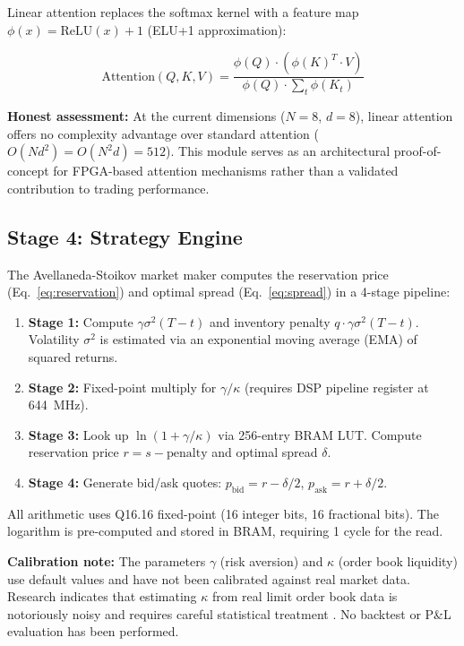 \documentclass[conference,10pt]{IEEEtran}
\begin{document}
Linear attention replaces the softmax kernel with a feature map $\phi(x) = \text{ReLU}(x) + 1$ (ELU+1 approximation):

\begin{equation}
\text{Attention}(Q,K,V) = \frac{\phi(Q) \cdot \left(\phi(K)^T \cdot V\right)}{\phi(Q) \cdot \sum_t \phi(K_t)}
\end{equation}

\textbf{Honest assessment:} At the current dimensions ($N = 8$, $d = 8$), linear attention offers no complexity advantage over standard attention ($O(N d^2) = O(N^2 d) = 512$). This module serves as an architectural proof-of-concept for FPGA-based attention mechanisms rather than a validated contribution to trading performance.

\subsection{Stage 4: Strategy Engine}

The Avellaneda-Stoikov market maker computes the reservation price (Eq.~\ref{eq:reservation}) and optimal spread (Eq.~\ref{eq:spread}) in a 4-stage pipeline:

\begin{enumerate}[leftmargin=*]
    \item \textbf{Stage 1:} Compute $\gamma \sigma^2 (T-t)$ and inventory penalty $q \cdot \gamma \sigma^2 (T-t)$. Volatility $\sigma^2$ is estimated via an exponential moving average (EMA) of squared returns.
    \item \textbf{Stage 2:} Fixed-point multiply for $\gamma/\kappa$ (requires DSP pipeline register at 644~MHz).
    \item \textbf{Stage 3:} Look up $\ln(1 + \gamma/\kappa)$ via 256-entry BRAM LUT. Compute reservation price $r = s - \text{penalty}$ and optimal spread $\delta$.
    \item \textbf{Stage 4:} Generate bid/ask quotes: $p_{\text{bid}} = r - \delta/2$, $p_{\text{ask}} = r + \delta/2$.
\end{enumerate}

All arithmetic uses Q16.16 fixed-point (16 integer bits, 16 fractional bits). The logarithm is pre-computed and stored in BRAM, requiring 1 cycle for the read.

\textbf{Calibration note:} The parameters $\gamma$ (risk aversion) and $\kappa$ (order book liquidity) use default values and have not been calibrated against real market data. Research indicates that estimating $\kappa$ from real limit order book data is notoriously noisy and requires careful statistical treatment \cite{avellaneda2008}. No backtest or P\&L evaluation has been performed.
\end{document}
